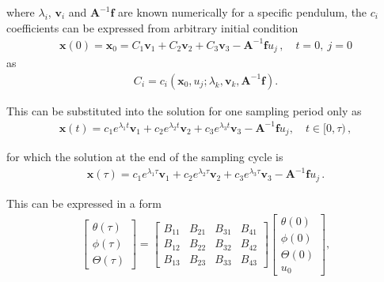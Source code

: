 \noindent where $\lambda_i$, $\mathbf v_i$ and $\mathbf A^{-1} \mathbf f$ are known numerically for a specific pendulum,  the $c_i$ coefficients can be expressed from arbitrary initial condition \begin{align}
	\mathbf x(0) = \mathbf x_0 = C_1 \mathbf v_1 
	+ C_2 \mathbf v_2 
	+ C_3 \mathbf v_3
	-\mathbf A^{-1} \mathbf f u_j\,,\quad t=0,\ j=0
\end{align}
\noindent as
\begin{align}
	C_i = c_i(\mathbf x_0, u_j;\lambda_k, \mathbf v_k, \mathbf A^{-1}\mathbf f).
\end{align}

\noindent This can be substituted into the solution for one sampling period only as
\begin{align}
	\mathbf x(t)
	= 
	c_1e^{\displaystyle \lambda_1 t}\mathbf v_1 
	+ c_2 e^{\displaystyle\lambda_2 t}\mathbf v_2 
	+ c_3 e^{\displaystyle\lambda_3 t}\mathbf v_3
	-\mathbf A^{-1} \mathbf f u_j,\quad t\in[0,\tau)\,,
\end{align}

\noindent for which the solution at the end of the sampling cycle is 
\begin{align}
	\mathbf x(\tau)
	= 
	c_1e^{\displaystyle \lambda_1 \tau}\mathbf v_1 
	+ c_2 e^{\displaystyle\lambda_2 \tau}\mathbf v_2 
	+ c_3 e^{\displaystyle\lambda_3 \tau}\mathbf v_3
	-\mathbf A^{-1} \mathbf f u_j\,.
\end{align}

\noindent This can be expressed in a form 
\begin{align}
		\begin{bmatrix}
			\theta(\tau)		\\
			\phi(\tau)		\\
			\Theta(\tau)
		\end{bmatrix}
		= 
		\begin{bmatrix}
			B_{ 1 1 } & B_{ 2 1 } & B_{ 3 1 } & B_{ 4 1 }\\
			B_{ 1 2 } & B_{ 2 2 } & B_{ 3 2 } & B_{ 4 2 }\\
			B_{ 1 3 } & B_{ 2 3 } & B_{ 3 3 } & B_{ 4 3 }
		\end{bmatrix}
		\begin{bmatrix}
			\theta(0)		\\
			\phi(0)		\\
			\Theta(0) \\
			u_0
		\end{bmatrix},
\end{align}

